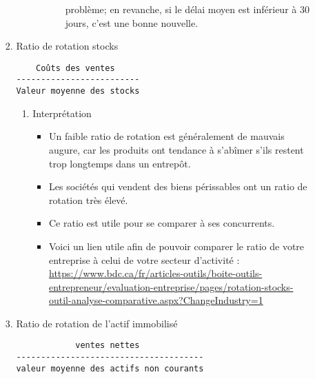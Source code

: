 \documentclass[11pt]{article}
\begin{document}
\begin{enumerate}
\begin{enumerate}
\begin{enumerate}
\begin{enumerate}
\begin{itemize}
\begin{itemize}
problème; en revanche, si le délai moyen est inférieur à 30 jours, c’est une bonne
nouvelle.
\end{itemize}
\end{itemize}
\end{enumerate}
\item Ratio de rotation stocks
\label{sec:org5f54452}
\begin{verbatim}
    Coûts des ventes
-------------------------
Valeur moyenne des stocks
\end{verbatim}
\begin{enumerate}
\item Interprétation
\label{sec:org0983b1f}
\begin{itemize}
\item Un faible ratio de rotation est généralement de mauvais augure, car les produits ont
tendance à s'abîmer s'ils restent trop longtemps dans un entrepôt.
\item Les sociétés qui vendent des biens périssables ont un ratio de rotation très élevé.
\item Ce ratio est utile pour se comparer à ses concurrents.
\item Voici un lien utile afin de pouvoir comparer le ratio de votre entreprise à celui de votre
secteur d’activité :
\url{https://www.bdc.ca/fr/articles-outils/boite-outils-entrepreneur/evaluation-entreprise/pages/rotation-stocks-outil-analyse-comparative.aspx?ChangeIndustry=1}
\end{itemize}
\end{enumerate}
\item Ratio de rotation de l'actif immobilisé
\label{sec:orgdd70e4b}
\begin{verbatim}
            ventes nettes
--------------------------------------
valeur moyenne des actifs non courants


\end{verbatim}
\end{enumerate}
\end{enumerate}
\end{enumerate}
\end{document}
